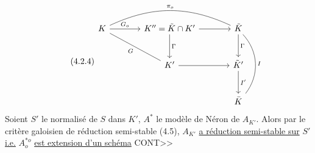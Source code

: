 \begin{equation}\tag{4.2.4}
\begin{tikzcd}[column sep=large, row sep=large]
K \arrow[r, "G_o"] \arrow[rd, dash, "G"'] \arrow[rr, bend left=25, dash, "\pi_o"] & K''=\tilde{K}\cap K' \arrow[r] \arrow[d, "\Gamma"] & \tilde{K} \arrow[d, "\Gamma"] \arrow[dd, bend left=40, dash, "I"] \\
& K' \arrow[r] & \tilde{K}' \arrow[d, "I'"] \\
& & \bar{K}
\end{tikzcd}
\end{equation}
Soient $S'$ le normalisé de $S$ dans $K'$, $A^*$ le modèle de Néron de $A_{K'}$. Alors par le critère galoisien de réduction semi-stable (4.5), $A_{K'}$ \underline{a réduction semi-stable sur} $S'$ \underline{i.e.} $A^{*o}_{o}$ \underline{est extension d'un schéma} CONT>>




